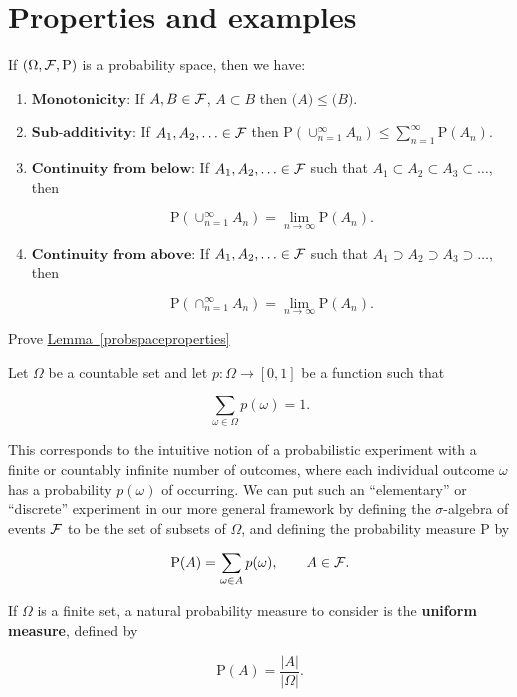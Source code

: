 \section{Properties and examples}

\begin{lem}
\label{probspaceproperties}
If $(\Omega, {\cal F}, \mathrm{P})$ is a probability
space, then we have:

\begin{enumerate}[label=(\roman*)]
\item $\textbf{Monotonicity:}$ If $A,B \in {\cal F}$,
$A\subset B$ then $\mathrm(A)\le \mathrm(B)$.

\item $\textbf{Sub-additivity:}$ If
$A_1,A_2,\ldots \in {\cal F}$ then
$\mathrm{P}(\cup_{n=1}^\infty A_n) \le
\sum_{n=1}^\infty \mathrm{P}(A_n)$.

\item $\textbf{Continuity from below:}$ If
$A_1,A_2,\ldots \in {\cal F}$ such that
$A_1 \subset A_2 \subset A_3 \subset \ldots$, then

\[
\mathrm{P}(\cup_{n=1}^\infty A_n) = \lim_{n\to\infty} \mathrm{P}(A_n).
\]

\item $\textbf{Continuity from above:}$ If
$A_1,A_2,\ldots \in {\cal F}$ such that
$A_1 \supset A_2 \supset A_3 \supset \ldots$, then

\[
\mathrm{P}(\cap_{n=1}^\infty A_n) = \lim_{n\to\infty} \mathrm{P}(A_n).
\]
\end{enumerate}

\end{lem}

\begin{xexercise}
Prove \hyperref[probspaceproperties]{Lemma~\ref*{probspaceproperties}}
\end{xexercise}

\begin{example}
Let $\Omega$ be a countable set and let
$p:\Omega\to[0,1]$ be a function such that

\[
\sum_{\omega \in \Omega} p(\omega) = 1.
\]

\noindent This corresponds to the intuitive notion of a
probabilistic experiment with a finite or countably
infinite number of outcomes, where each individual
outcome $\omega$ has a probability $p(\omega)$ of
occurring. We can put such an ``elementary'' or
``discrete'' experiment in our more general framework
by defining the $\sigma$-algebra of events ${\cal F}$
to be the set of subsets of $\Omega$, and defining
the probability measure $\mathrm{P}$ by

\[
\mathrm{P}(A) = \sum_{\omega \in A} p(\omega), \qquad A\in {\cal F}.
\]

\noindent If $\Omega$ is a finite set, a natural probability
measure to consider is the \textbf{uniform measure},
defined by

\[
\mathrm{P}(A) = \frac{|A|}{|\Omega|}.
\]

\end{example}

